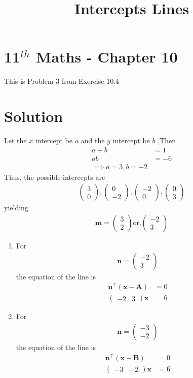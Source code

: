 \documentclass[12pt]{article}
\providecommand{\brak}[1]{\ensuremath{\left(#1\right)}}
\newcommand{\myvec}[1]{\ensuremath{\begin{pmatrix}#1\end{pmatrix}}}
\let\vec\mathbf
\begin{document}
\begin{center}
\title{\textbf{ Intercepts Lines}}
\date{\vspace{-5ex}} %
\maketitle
\end{center}
\setcounter{page}{eq:11/10/4/31}
\section*{11$^{th}$ Maths - Chapter 10}
This is Problem-3 from Exercise 10.4
\section{Solution}
\fi
Let the $x$ intercept be $a$ and  the $y$ intercept be $b$ ,Then
\begin{align}
a+b&=1\label{eq:11/10/4/31a}\\
ab&=-6 \label{eq:11/10/4/32a}
\\
\implies  a = 3, b = -2
\end{align}
Thus, the possible 
intercepts are
\begin{align}
\myvec{3\\0}, \myvec{0\\-2},
\myvec{-2\\0}, \myvec{0\\3}
\end{align}
yielding
\begin{align}		
\vec{m}=\myvec{3\\2} \text{or,} \myvec{-2\\3}
\end{align}
\begin{enumerate}
\item For 
\begin{align}
\vec{n}
=\myvec{-2 \\3} 
\end{align}
the equation of the line is 
\begin{align}
	\vec{n}^\top\brak{\vec{x}-\vec{A}} &= 0 \\
	\myvec { -2 & 3 } \vec{x}  &= 6  
\end{align}
\item  For 
\begin{align}
\vec{n}
=\myvec{-3 \\-2} 
\end{align}
the equation of the line is 
\begin{align}
    \vec{n}^\top\brak{\vec{x}-\vec{B}} &= 0 \\  
	\myvec { -3 & -2 }  \vec{x}  &= 6        
\end{align}
\end{enumerate}
\end{document}
